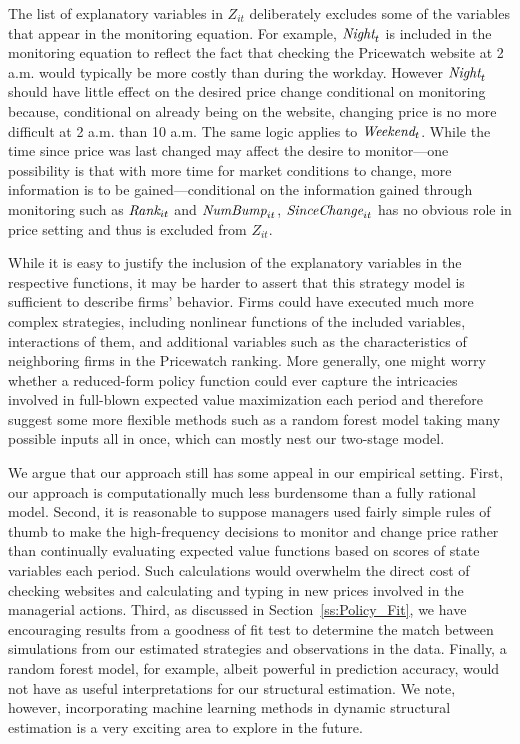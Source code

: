 \documentclass[11pt]{article}
\newcommand{\SinceChange}{\mbox{\it SinceChange}}
\newcommand{\Rank}{\mbox{\it Rank}}
\newcommand{\NumBump}{\mbox{\it NumBump}}
\newcommand{\Night}{\mbox{\it Night}}
\newcommand{\Weekend}{\mbox{\it Weekend}}
\begin{document}
\begin{spacing}{1.3}
The list of explanatory variables in $Z_{it}$ deliberately excludes
some of the variables that appear in the monitoring equation. For
example, $\Night_t$ is included in the monitoring equation to reflect
the fact that checking the Pricewatch website at 2 a.m. would
typically be more costly than during the workday. However $\Night_t$
should have little effect on the desired price change conditional on
monitoring because, conditional on already being on the website,
changing price is no more difficult at 2 a.m. than 10 a.m. The same
logic applies to $\Weekend_t$. While the time since price was last
changed may affect the desire to monitor---one possibility is that
with more time for market conditions to change, more information is to
be gained---conditional on the information gained through monitoring
such as $\Rank_{it}$ and $\NumBump_{it}$, $\SinceChange_{it}$ has no
obvious role in price setting and thus is excluded from $Z_{it}$.

While it is easy to justify the inclusion of the explanatory variables
in the respective functions, it may be harder to assert that this
strategy model is sufficient to describe firms' behavior. Firms could
have executed much more complex strategies, including nonlinear
functions of the included variables, interactions of them, and
additional variables such as the characteristics of neighboring firms
in the Pricewatch ranking. More generally, one might worry whether a
reduced-form policy function could ever capture the intricacies
involved in full-blown expected value maximization each period and
therefore suggest some more flexible methods such as a random forest
model taking many possible inputs all in once, which can mostly nest
our two-stage model. 

We argue that our approach still has some appeal in our empirical
setting. First, our approach is computationally much less burdensome
than a fully rational model. Second, it is reasonable to suppose
managers used fairly simple rules of thumb to make the high-frequency
decisions to monitor and change price rather than continually
evaluating expected value functions based on scores of state variables
each period. Such calculations would overwhelm the direct cost of
checking websites and calculating and typing in new prices involved in
the managerial actions.  Third, as discussed in
Section~\ref{ss:Policy_Fit}, we have encouraging results from a
goodness of fit test to determine the match between simulations from
our estimated strategies and observations in the data. Finally, a random
forest model, for example, albeit powerful in prediction accuracy, would
not have as useful interpretations for our structural estimation. We note,
however, incorporating machine learning methods in dynamic structural
estimation is a very exciting area to explore in the future.  


\end{spacing}
\end{document}
